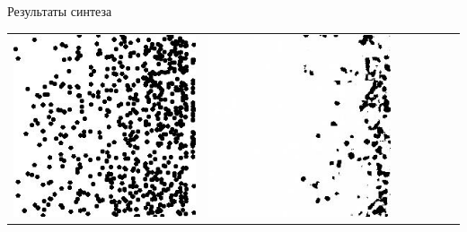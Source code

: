 \documentclass[12pt]{beamer}
\begin{document}
\begin{frame}{Результаты синтеза}
\begin{table}
\begin{center}
\begin{tabular}{p{1.2cm} p{1.2cm} p{1.2cm} p{1.2cm} p{1.2cm} p{1.2cm} p{1.2cm}}
					\includegraphics[width=1\linewidth]{8-results/sand-trend2/pan3}
					&
					\includegraphics[width=1\linewidth]{8-results/sand-trend2/nf8/gen3}
					&

\end{tabular}
\end{center}
\end{table}
\end{frame}
\end{document}
